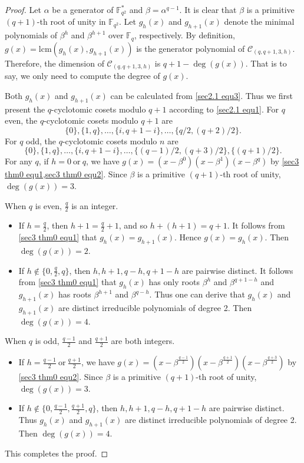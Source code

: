 \documentclass[10pt]{article}%
\begin{document}
	\begin{proof}
		Let $\alpha$ be a generator of $\mathbb{F}_{q^2}^{\ast}$ and $\beta=\alpha^{q-1}$. It is clear that $\beta$ is a primitive $(q+1)$-th root of unity in $\mathbb{F}_{q^2}$. Let $g_h(x)$ and $g_{h+1}(x)$ denote the minimal polynomials of $\beta^h$ and $\beta^{h+1}$ over $\mathbb{F}_q$, respectively. By definition, $g(x)=\mathrm{lcm}\left(g_h(x),g_{h+1}(x)\right)$ is the generator polynomial of $\mathcal{C}_{(q,q+1,3,h)}$. Therefore, the dimension of $\mathcal{C}_{(q,q+1,3,h)}$ is $q+1-\deg(g(x))$. That is to say, we only need to compute the degree of $g(x)$.
		
		Both $g_h(x)$ and $g_{h+1}(x)$ can be calculated from \cref{sec2.1 equ3}. Thus we first present the $q$-cyclotomic cosets modulo $q+1$ according to \cref{sec2.1 equ1}. For $q$ even, the $q$-cyclotomic cosets modulo $q+1$ are 
		\begin{equation}\label{sec3 thm0 equ1}
			\{0\},\{1,q\},\ldots,\{i,q+1-i\},\ldots,\{q/2,(q+2)/2\}.
		\end{equation}
		For $q$ odd, the $q$-cyclotomic cosets modulo $n$ are 
		\begin{equation}\label{sec3 thm0 equ2}
			\{0\},\{1,q\},\ldots,\{i,q+1-i\},\ldots,\{(q-1)/2,(q+3)/2\},\{(q+1)/2\}.
		\end{equation}
		For any $q$, if $h=0\ \mathrm{or}\ q$, we have $g(x)=(x-\beta^0)(x-\beta^1)(x-\beta^q)$ by \cref{sec3 thm0 equ1,sec3 thm0 equ2}. Since $\beta$ is a primitive $(q+1)$-th root of unity, $\deg(g(x))=3$.
		
		When $q$ is even, $\frac{q}{2}$ is an integer. 
		\begin{itemize}
			\item If $h=\frac{q}{2}$, then $h+1=\frac{q}{2}+1$, and so $h+(h+1)=q+1$. It follows from \cref{sec3 thm0 equ1} that $g_h(x)=g_{h+1}(x)$. Hence $g(x)=g_h(x)$. Then $\deg(g(x))=2$.
			\item If $h\notin\{0,\frac{q}{2},q\}$, then $h,h+1,q-h,q+1-h$ are pairwise distinct. It follows from \cref{sec3 thm0 equ1} that $g_h(x)$ has only roots $\beta^{h}$ and $\beta^{q+1-h}$ and $g_{h+1}(x)$ has roots $\beta^{h+1}$ and $\beta^{q-h}$. Thus one can derive that $g_h(x)$ and $g_{h+1}(x)$ are distinct irreducible polynomials of degree 2. Then $\deg(g(x))=4$.
		\end{itemize}
		
		When $q$ is odd, $\frac{q-1}{2}$ and $\frac{q+1}{2}$ are both integers. 
		\begin{itemize}
			\item If $h=\frac{q-1}{2}\ \mathrm{or}\ \frac{q+1}{2}$, we have $g(x)=(x-\beta^{\frac{q-1}{2}})(x-\beta^{\frac{q+1}{2}})(x-\beta^\frac{q+3}{2})$ by \cref{sec3 thm0 equ2}. Since $\beta$ is a primitive $(q+1)$-th root of unity, $\deg(g(x))=3$.
			\item If $h\notin\{0,\frac{q-1}{2},\frac{q+1}{2},q\}$, then $h,h+1,q-h,q+1-h$ are pairwise distinct. Thus $g_h(x)$ and $g_{h+1}(x)$ are distinct irreducible polynomials of degree 2. Then $\deg(g(x))=4$.
		\end{itemize}
		This completes the proof.  
	\end{proof}
	 
\end{document}

